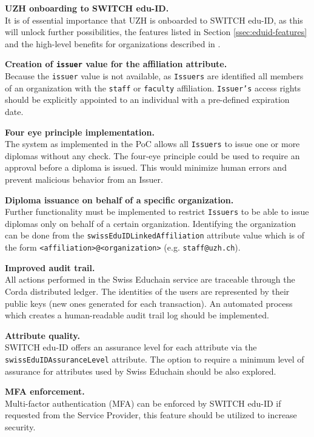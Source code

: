 \begin{description}
	\item \textbf{UZH onboarding to SWITCH edu-ID.} \hfill \\
	It is of essential importance that UZH is onboarded to SWITCH edu-ID, as this will unlock further possibilities, the features listed in Section \ref{ssec:eduid-features} and the high-level benefits for organizations described in \cite{eduid-for-organizations}.
	\item \textbf{Creation of \texttt{issuer} value for the affiliation attribute.} \hfill \\
	Because the \texttt{issuer} value is not available, as \texttt{Issuers} are identified all members of an organization with the \texttt{staff} or \texttt{faculty} affiliation. \texttt{Issuer's} access rights should be explicitly appointed to an individual with a pre-defined expiration date.
	\item \textbf{Four eye principle implementation.} \hfill \\
	The system as implemented in the PoC allows all \texttt{Issuers} to issue one or more diplomas without any check. The four-eye principle could be used to require an approval before a diploma is issued. This would minimize human errors and prevent malicious behavior from an Issuer.
	\item \textbf{Diploma issuance on behalf of a specific organization.} \hfill \\
	Further functionality must be implemented to restrict \texttt{Issuers} to be able to issue diplomas only on behalf of a certain organization. Identifying the organization can be done from the \texttt{swissEduIDLinkedAffiliation} attribute value which is of the form \texttt{<affiliation>@<organization>} (e.g. \texttt{staff@uzh.ch}).
	\item \textbf{Improved audit trail.} \hfill \\
	All actions performed in the Swiss Educhain service are traceable through the Corda distributed ledger. The identities of the users are represented by their public keys (new ones generated for each transaction). An automated process which creates a human-readable audit trail log should be implemented.
	\item \textbf{Attribute quality.} \hfill \\
	SWITCH edu-ID offers an assurance level for each attribute via the \texttt{swissEduIDAssuranceLevel} attribute. The option to require a minimum level of assurance for attributes used by Swiss Educhain should be also explored.
	\item \textbf{MFA enforcement.} \hfill \\
	Multi-factor authentication (MFA) can be enforced by SWITCH edu-ID if requested from the Service Provider, this feature should be utilized to increase security.
\end{description}